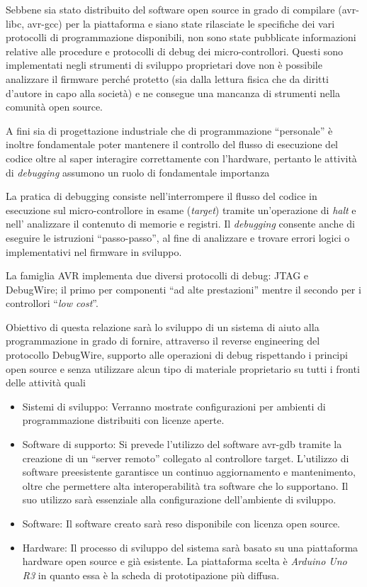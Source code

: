 Sebbene sia stato distribuito del software open source in grado di compilare (avr-libc\cite{site:avr-libc}, avr-gcc\cite{site:avr-gcc}) per la piattaforma e siano state rilasciate le specifiche dei vari protocolli di programmazione disponibili\cite{avr:appnote:isp}\cite{avr:appnote:tpi}\cite{avr:appnote:pdi}, non sono state pubblicate informazioni relative alle procedure e protocolli di debug dei micro-controllori. 
Questi sono implementati negli strumenti di sviluppo proprietari dove non è possibile analizzare il firmware perché protetto (sia dalla lettura fisica che da diritti d'autore in capo alla società) e ne consegue una mancanza di strumenti nella comunità open source.

A fini sia di progettazione industriale che di programmazione ``personale'' è inoltre fondamentale poter mantenere il controllo del flusso di esecuzione del codice oltre al saper interagire correttamente con l'hardware, pertanto le attività di \textit{debugging} assumono un ruolo di fondamentale importanza

La pratica di debugging consiste nell'interrompere il flusso del codice in esecuzione sul micro-controllore in esame (\textit{target}) tramite un'operazione di \textit{halt} e nell' analizzare il contenuto di memorie e registri. Il \textit{debugging} consente anche di eseguire le istruzioni ``passo-passo'', al fine di analizzare e trovare errori logici o implementativi nel firmware in sviluppo.

La famiglia AVR implementa due diversi protocolli di debug: JTAG e DebugWire; il primo per componenti ``ad alte prestazioni'' mentre il secondo per i controllori ``\textit{low cost}''.

Obiettivo di questa relazione sarà lo sviluppo di un sistema di aiuto alla programmazione in grado di fornire, attraverso il reverse engineering del protocollo DebugWire\cite{site:dw-reverse-engeneering}, supporto alle operazioni di debug rispettando i principi open source e senza utilizzare alcun tipo di materiale proprietario su tutti i fronti delle attività quali 
\begin{itemize}
    \item Sistemi di sviluppo: Verranno mostrate configurazioni per ambienti di programmazione distribuiti con licenze aperte. 
    \item Software di supporto: Si prevede l'utilizzo del software avr-gdb\cite{site:gdb} tramite la creazione di un ``server remoto'' collegato al controllore target. L'utilizzo di software preesistente garantisce un continuo aggiornamento e mantenimento, oltre che permettere alta interoperabilità tra software che lo supportano. Il suo utilizzo sarà essenziale alla configurazione dell'ambiente di sviluppo.
    \item Software: Il software creato sarà reso disponibile con licenza open source.
    \item Hardware: Il processo di sviluppo del sistema sarà basato su una piattaforma hardware open source e già esistente. La piattaforma scelta è \textit{Arduino Uno R3} in quanto essa è la scheda di prototipazione più diffusa.
\end{itemize}

